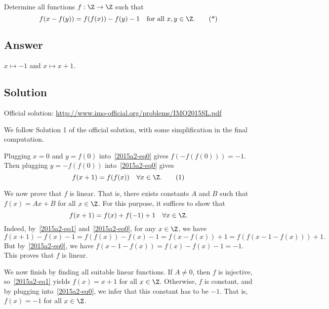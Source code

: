 Determine all functions $f : \Z \to \Z$ such that
\[ f(x - f(y)) = f(f(x)) - f(y) - 1 \quad \text{for all } x, y \in \Z. \tag{*}\label{2015a2-eq0} \]



\subsection*{Answer}

$x \mapsto -1$ and $x \mapsto x + 1$.



\subsection*{Solution}

Official solution: \url{http://www.imo-official.org/problems/IMO2015SL.pdf}

We follow Solution 1 of the official solution, with some simplification in the final computation.

Plugging $x = 0$ and $y = f(0)$ into~\eqref{2015a2-eq0} gives $f(-f(f(0))) = -1$.
Then plugging $y = -f(f(0))$ into~\eqref{2015a2-eq0} gives
\[ f(x + 1) = f(f(x)) \quad \forall x \in \Z. \tag{1}\label{2015a2-eq1} \]

We now prove that $f$ is linear.
That is, there exists constants $A$ and $B$ such that $f(x) = Ax + B$ for all $x \in \Z$.
For this purpose, it suffices to show that
\[ f(x + 1) = f(x) + f(-1) + 1 \quad \forall x \in \Z. \]
Indeed, by~\eqref{2015a2-eq1} and~\eqref{2015a2-eq0}, for any $x \in \Z$, we have
\[ f(x + 1) - f(x) - 1 = f(f(x)) - f(x) - 1 = f(x - f(x)) + 1 = f(f(x - 1 - f(x))) + 1. \]
But by~\eqref{2015a2-eq0}, we have $f(x - 1 - f(x)) = f(x) - f(x) - 1 = -1$.
This proves that $f$ is linear.

We now finish by finding all suitable linear functions.
If $A \neq 0$, then $f$ is injective, so~\eqref{2015a2-eq1} yields $f(x) = x + 1$ for all $x \in \Z$.
Otherwise, $f$ is constant, and by plugging into~\eqref{2015a2-eq0}, we infer that this constant has to be $-1$.
That is, $f(x) = -1$ for all $x \in \Z$.
